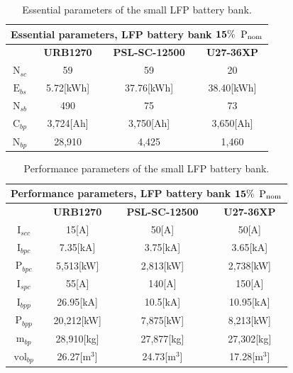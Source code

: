 \begin{table}[H]
	\centering
	\caption{Essential parameters of the small LFP battery bank.}
	\label{tab:LFP_015_1}
	\begin{tabular}{|c|c|c|c|}
		\hline
		\multicolumn{4}{|c|}{\textbf{Essential parameters, LFP battery bank} $\bf 15\%$ ${\bf \text{P}}_{\bf \text{nom}}$} \\
		\hline\hline
		 &  \textbf{URB1270} & \textbf{PSL-SC-12500} & \textbf{U27-36XP}\\
		 \hline
		$\text{N}_{sc}$ & 59  & 59 & 20 \\	
		\hline
		$\text{E}_{bs}$ &  5.72[kWh] & 37.76[kWh] & 38.40[kWh]\\	
		\hline
		$\text{N}_{sb}$ &  490 & 75 & 73\\	
		\hline
		$\text{C}_{bp}$ & 3,724[Ah]& 3,750[Ah] & 3,650[Ah]\\	
		\hline
		$\text{N}_{bp}$ & 28,910 & 4,425 &   1,460  \\	
		\hline		
	\end{tabular}
\end{table}

\begin{table}[H]
	\centering
	\caption{Performance parameters of the small LFP battery bank.}
	\label{tab:LFP_015_2}
	\begin{tabular}{|c|c|c|c|}
		\hline
		\multicolumn{4}{|c|}{\textbf{Performance parameters, LFP battery bank} $\bf 15\%$ ${\bf \text{P}}_{\bf \text{nom}}$} \\
		\hline\hline
		 &  \textbf{URB1270} & \textbf{PSL-SC-12500} & \textbf{U27-36XP}\\
		 \hline
		$\text{I}_{scc}$ & 15[A]  & 50[A] & 50[A] \\	
		\hline
		$\text{I}_{bpc}$ &  7.35[kA] & 3.75[kA] & 3.65[kA]\\	
		\hline
		$\text{P}_{bpc}$ &   5,513[kW] & 2,813[kW] &   2,738[kW]  \\	
		\hline
		$\text{I}_{spc}$ & 55[A] & 140[A] & 150[A] \\	
		\hline
		$\text{I}_{bpp}$ & 26.95[kA] & 10.5[kA] & 10.95[kA]  \\	
		\hline
		$\text{P}_{bpp}$ & 20,212[kW] & 7,875[kW] & 8,213[kW]  \\	
		\hline		
		$\text{m}_{bp}$ & 28,910[kg]  & 27,877[kg] & 27,302[kg] \\	
		\hline
		$\text{vol}_{bp}$ &  26.27[${\text{m}}^{3}$] & 24.73[${\text{m}}^{3}$] & 17.28[${\text{m}}^{3}$]\\	
		\hline
	\end{tabular}
\end{table}

